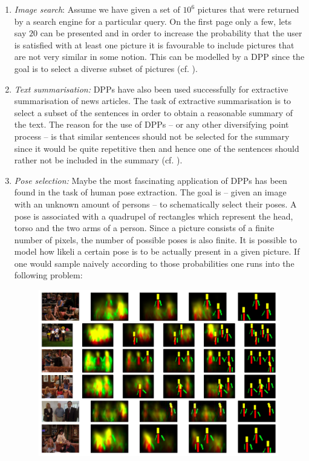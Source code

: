 \begin{enumerate}
\item \emph{Image search}: Assume we have given a set of \(10^6\) pictures that were returned by a search engine for a particular query. On the first page only a few, lets say \(20\) can be presented and in order to increase the probability that the user is satisfied with at least one picture it is favourable to include pictures that are not very similar in some notion. This can be modelled by a DPP since the goal is to select a diverse subset of pictures (cf. \cite{kulesza2011k}). %
\item \emph{Text summarisation:} DPPs have also been used successfully for extractive summarisation of news articles. The task of extractive summarisation is to select a subset of the sentences in order to obtain a reasonable summary of the text. The reason for the use of DPPs -- or any other diversifying point process -- is that similar sentences should not be selected for the summary since it would be quite repetitive then and hence one of the sentences should rather not be included in the summary (cf. \cite{kulesza2012learning1}). 
\item \emph{Pose selection:} Maybe the most fascinating application of DPPs has been found in the task of human pose extraction. The goal is -- given an image with an unknown amount of persons -- to schematically select their poses. A pose is associated with a quadrupel of rectangles which represent the head, torso and the two arms of a person. Since a picture consists of a finite number of pixels, the number of possible poses is also finite. It is possible to model how likeli a certain pose is to be actually present in a given picture. If one would sample naively according to those probabilities one runs into the following problem:
\begin{figure}[h!]
	\centering
	\includegraphics[width=0.99\textwidth]{figures/pose-estimation}

\end{figure}
\end{enumerate}
